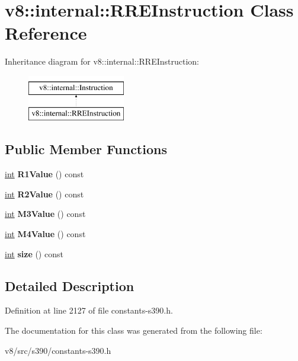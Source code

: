 \hypertarget{classv8_1_1internal_1_1RREInstruction}{}\section{v8\+:\+:internal\+:\+:R\+R\+E\+Instruction Class Reference}
\label{classv8_1_1internal_1_1RREInstruction}
Inheritance diagram for v8\+:\+:internal\+:\+:R\+R\+E\+Instruction\+:\begin{figure}[H]
\begin{center}
\leavevmode
\includegraphics[height=2.000000cm]{classv8_1_1internal_1_1RREInstruction}
\end{center}
\end{figure}
\subsection*{Public Member Functions}
\begin{DoxyCompactItemize}
\item 
\mbox{\label{classv8_1_1internal_1_1RREInstruction_a92ec74d67bf7a28e78282a7af47db252}} 
\mbox{\hyperlink{classint}{int}} {\bfseries R1\+Value} () const
\item 
\mbox{\label{classv8_1_1internal_1_1RREInstruction_a84ba32f2d44ba39584e9cf89e8bfc955}} 
\mbox{\hyperlink{classint}{int}} {\bfseries R2\+Value} () const
\item 
\mbox{\label{classv8_1_1internal_1_1RREInstruction_a3b25e789ecf12dcb85c197455fda84a7}} 
\mbox{\hyperlink{classint}{int}} {\bfseries M3\+Value} () const
\item 
\mbox{\label{classv8_1_1internal_1_1RREInstruction_aae0efd1afab93f5e46c416d3c710da99}} 
\mbox{\hyperlink{classint}{int}} {\bfseries M4\+Value} () const
\item 
\mbox{\label{classv8_1_1internal_1_1RREInstruction_af758e687257c2d3f2023fcfec4e45886}} 
\mbox{\hyperlink{classint}{int}} {\bfseries size} () const
\end{DoxyCompactItemize}


\subsection{Detailed Description}


Definition at line 2127 of file constants-\/s390.\+h.



The documentation for this class was generated from the following file\+:\begin{DoxyCompactItemize}
\item 
v8/src/s390/constants-\/s390.\+h\end{DoxyCompactItemize}
